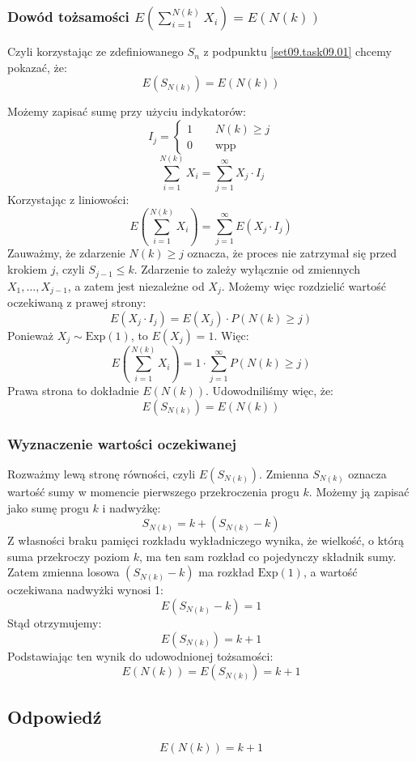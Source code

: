 \subsubsection*{Dowód tożsamości \(E(\sum_{i=1}^{N(k)}X_i) = E(N(k))\)}
Czyli korzystając ze zdefiniowanego \(S_n\) z podpunktu \ref{set09.task09.01} chcemy pokazać, że:
\[    E(S_{N(k)}) = E(N(k)) \]

Możemy zapisać sumę przy użyciu indykatorów:
\[ I_j = \begin{cases}
		1 \qquad N(k) \ge j \\
		0 \qquad \text{wpp}
	\end{cases}\]
\[ \sum_{i=1}^{N(k)} X_i = \sum_{j=1}^\infty X_j \cdot I_j \]
Korzystając z liniowości:
\[ E\left(\sum_{i=1}^{N(k)} X_i\right) = \sum_{j=1}^\infty E\left(X_j \cdot I_j\right) \]
Zauważmy, że zdarzenie \(N(k) \ge j\) oznacza, że proces nie zatrzymał się przed krokiem \(j\), czyli \(S_{j-1} \le k\).
Zdarzenie to zależy wyłącznie od zmiennych \(X_1, \dots, X_{j-1}\), a zatem jest niezależne od \(X_j\).
Możemy więc rozdzielić wartość oczekiwaną z prawej strony:
\[ E\left(X_j \cdot I_j\right) = E(X_j) \cdot P(N(k) \ge j) \]
Ponieważ \(X_j \sim \text{Exp}(1)\), to \(E(X_j) = 1\).
Więc:
\[ E\left(\sum_{i=1}^{N(k)} X_i\right) = 1 \cdot \sum_{j=1}^\infty P(N(k) \ge j) \]
Prawa strona to dokładnie \(E(N(k))\). Udowodniliśmy więc, że:
\[ E(S_{N(k)}) = E(N(k)) \]

\subsubsection*{Wyznaczenie wartości oczekiwanej}

Rozważmy lewą stronę równości, czyli \(E(S_{N(k)})\).
Zmienna \(S_{N(k)}\) oznacza wartość sumy w momencie pierwszego przekroczenia progu \(k\).
Możemy ją zapisać jako sumę progu \(k\) i nadwyżkę:
\[ S_{N(k)} = k + (S_{N(k)} - k) \]
Z własności braku pamięci rozkładu wykładniczego wynika, że wielkość,
o którą suma przekroczy poziom \(k\), ma ten sam rozkład co pojedynczy składnik sumy.
Zatem zmienna losowa \((S_{N(k)} - k)\) ma rozkład \(\text{Exp}(1)\), a wartość oczekiwana nadwyżki wynosi 1:
\[ E(S_{N(k)} - k) = 1 \]
Stąd otrzymujemy:
\[ E(S_{N(k)}) = k + 1 \]
Podstawiając ten wynik do udowodnionej tożsamości:
\[ E(N(k)) = E(S_{N(k)}) = k + 1  \]

\subsection*{Odpowiedź}
\[
	\boxed{E(N(k)) = k + 1}
\]
